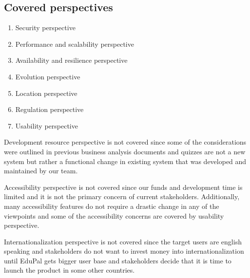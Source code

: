 \subsection{Covered perspectives}

\begin{enumerate}
    \item Security perspective
    \item Performance and scalability perspective
    \item Availability and resilience perspective
    \item Evolution perspective
    \item Location perspective
    \item Regulation perspective
    \item Usability perspective
\end{enumerate}

Development resource perspective is not covered since some of the considerations were outlined in previous business analysis documents and quizzes are not a new system but rather a functional change in existing system that was developed and maintained by our team.

Accessibility perspective is not covered since our funds and development time is limited and it is not the primary concern of current stakeholders. Additionally, many accessibility features do not require a drastic change in any of the viewpoints and some of the accessibility concerns are covered by usability perspective.

Internationalization perspective is not covered since the target users are english speaking and stakeholders do not want to invest money into internationalization until EduPal gets bigger user base and stakeholders decide that it is time to launch the product in some other countries.


